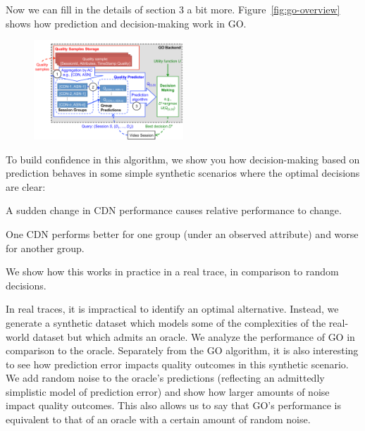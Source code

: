 Now we can fill in the details of section 3 a bit more.  Figure~\ref{fig:go-overview} shows how prediction and decision-making work in GO.



\begin{figure}[h!]
\centering
 \includegraphics[width=0.5\textwidth] {figures/backend.pdf}
\label{fig:backend}
\end{figure}

To build confidence in this algorithm, we show you how decision-making based on prediction behaves in some simple synthetic scenarios where the optimal decisions are clear:
\begin{packedenumerate}
  \item A sudden change in CDN performance causes relative performance to change.
  \item One CDN performs better for one group (under an observed attribute) and worse for another group.
\end{packedenumerate}

We show how this works in practice in a real trace, in comparison to random decisions.

In real traces, it is impractical to identify an optimal alternative.  Instead, we generate a synthetic dataset which models some of the complexities of the real-world dataset but which admits an oracle.  We analyze the performance of GO in comparison to the oracle.  Separately from the GO algorithm, it is also interesting to see how prediction error impacts quality outcomes in this synthetic scenario.  We add random noise to the oracle’s predictions (reflecting an admittedly simplistic model of prediction error) and show how larger amounts of noise impact quality outcomes.  This also allows us to say that GO’s performance is equivalent to that of an oracle with a certain amount of random noise.

